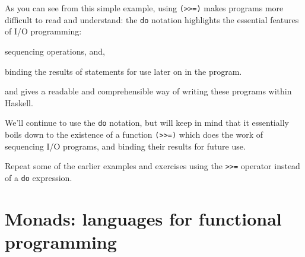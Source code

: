 As you can see from this simple example, using \texttt{(>>=)} makes programs more difficult to read and understand: the \texttt{do} notation highlights the essential features of I/O programming:
\begin{titemize}
\item sequencing operations, and,
\item binding the results of statements for use later on in the program.
\end{titemize}
and gives a readable and comprehensible way of writing these programs within Haskell.

We'll continue to use the
\texttt{do} notation, but will keep in mind that it essentially boils down to the existence of a
function \texttt{(>>=)} which does the work of sequencing I/O programs, and binding their results for future use.

\begin{exerciseone}
\item
Repeat some of the earlier examples and exercises using the \texttt{>>=}
operator instead of a \texttt{do} expression.
\end{exerciseone}

\section{Monads: languages for functional programming}
\label{monadFP}


